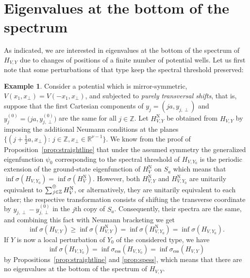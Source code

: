 \documentclass{article}
\numberwithin{equation}{section}
\theoremstyle{definition}
\newtheorem{example}[theorem]{Example}
\newcommand{\R}{\mathbb{R}}
\newcommand{\Z}{\mathbb{Z}}
\newcommand{\sumoplus}{\!\raisebox{1.5ex}{{\scriptsize $\oplus$}}}
\begin{document}
\section{Eigenvalues at the bottom of the spectrum}
\label{s:bottomev}

As indicated, we are interested in eigenvalues at the bottom of the spectrum of $H_{V,Y}$ due to changes of positions of a finite number of potential wells. Let us first note that some perturbations of that type keep the spectral threshold preserved:
\begin{example} \label{ex:puretrans}
Consider a potential which is mirror-symmetric, $V(x_1,x_\perp)=V(-x_1,x_\perp)$, and subjected to \emph{purely transversal shifts}, that is, suppose that the first Cartesian components of $y_j=(ja,y_{j,\perp})$ and $y_j^{(0)}=\big(ja,y_{j,\perp}^{(0)}\big)$ are the same for all $j\in\Z$. Let $H_{V,Y}^\mathrm{N}$ be obtained from $H_{V,Y}$ by imposing the additional Neumann conditions at the planes $\big\{(j+\frac12a,x_\perp):\, j\in\Z, x_\perp\in\R^{\nu-1}\big\}$. We know from the proof of Proposition~\ref{prop:straightline} that under the assumed symmetry the generalized eigenfunction $\psi_0$ corresponding to the spectral threshold of $H_{V,Y_0}$ is the periodic extension of the ground-state eigenfunction of $H_V^\mathrm{N}$ on $S_a$ which means that $\inf\sigma(H_{V,Y_0})=\inf\sigma(H_V^\mathrm{N})$. However, both $H_{V,Y}^\mathrm{N}$ and $H_{V,Y_0}^\mathrm{N}$ are unitarily equivalent to $\sum{\sumoplus}_{\!\!\!\!j\in\Z}\, H_V^\mathrm{N}$, or alternatively, they are unitarily equivalent to each other; the respective transformation consists of shifting the transverse coordinate by $y_{j,\perp}-y_{j,\perp}^{(0)}$ in the $j$th copy of $S_a$. Consequently, their spectra are the same, and combining this fact with Neumann bracketing \cite[Sec.~XIII.15]{RS} we get
\begin{equation} \label{infspess}
\inf\sigma(H_{V,Y}) \ge \inf\sigma(H_{V,Y}^\mathrm{N}) = \inf\sigma(H_{V,Y_0}^\mathrm{N}) = \inf\sigma(H_{V,Y_0}).
\end{equation}
If $Y$ is now a local perturbation of $Y_0$ of the considered type, we have
\begin{equation} \label{infspess2}
\inf\sigma(H_{V,Y_0}) = \inf\sigma_\mathrm{ess}(H_{V,Y_0}) = \inf\sigma_\mathrm{ess}(H_{V,Y})
\end{equation}
by Propositions~\ref{prop:straightline} and \ref{prop:spess}, which means that there are no eigenvalues at the bottom of the spectrum of $H_{V,Y}$.


\end{example}
\end{document}
